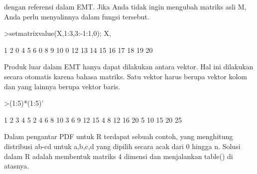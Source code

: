 \documentclass[a4paper,10pt]{article}
\begin{document}
\begin{eulernotebook}
\begin{eulercomment}
\begin{eulercomment}
\begin{eulercomment}
\begin{eulercomment}
\begin{eulercomment}
\begin{eulercomment}
\begin{eulercomment}
\begin{eulercomment}
\begin{eulercomment}
\begin{eulercomment}
\begin{eulercomment}
\begin{eulercomment}
\begin{eulercomment}
\begin{eulercomment}
\begin{eulercomment}
\begin{eulercomment}
\begin{eulercomment}
\begin{eulercomment}
\begin{eulercomment}
\begin{eulercomment}
\begin{eulercomment}
\begin{eulercomment}
\begin{eulercomment}
\begin{eulercomment}
\begin{eulercomment}
\begin{eulercomment}
\begin{eulercomment}
\begin{eulercomment}
\begin{eulercomment}
\begin{eulercomment}
\begin{eulercomment}
\begin{eulercomment}
\begin{eulercomment}
\begin{eulercomment}
\begin{eulercomment}
dengan referensi dalam EMT. Jika Anda tidak ingin mengubah matriks
asli M, Anda perlu menyalinnya dalam fungsi tersebut.
\end{eulercomment}
\begin{eulerprompt}
>setmatrixvalue(X,1:3,3:-1:1,0); X,
\end{eulerprompt}
\begin{euleroutput}
          1         2         0         4         5 
          6         0         8         9        10 
          0        12        13        14        15 
         16        17        18        19        20 
\end{euleroutput}
\begin{eulercomment}
Produk luar dalam EMT hanya dapat dilakukan antara vektor. Hal ini
dilakukan secara otomatis karena bahasa matriks. Satu vektor harus
berupa vektor kolom dan yang lainnya berupa vektor baris.
\end{eulercomment}
\begin{eulerprompt}
>(1:5)*(1:5)'
\end{eulerprompt}
\begin{euleroutput}
          1         2         3         4         5 
          2         4         6         8        10 
          3         6         9        12        15 
          4         8        12        16        20 
          5        10        15        20        25 
\end{euleroutput}
\begin{eulercomment}
Dalam pengantar PDF untuk R terdapat sebuah contoh, yang menghitung
distribusi ab-cd untuk a,b,c,d yang dipilih secara acak dari 0 hingga
n. Solusi dalam R adalah membentuk matriks 4 dimensi dan menjalankan
table() di atasnya.


\end{eulercomment}
\end{eulercomment}
\end{eulercomment}
\end{eulercomment}
\end{eulercomment}
\end{eulercomment}
\end{eulercomment}
\end{eulercomment}
\end{eulercomment}
\end{eulercomment}
\end{eulercomment}
\end{eulercomment}
\end{eulercomment}
\end{eulercomment}
\end{eulercomment}
\end{eulercomment}
\end{eulercomment}
\end{eulercomment}
\end{eulercomment}
\end{eulercomment}
\end{eulercomment}
\end{eulercomment}
\end{eulercomment}
\end{eulercomment}
\end{eulercomment}
\end{eulercomment}
\end{eulercomment}
\end{eulercomment}
\end{eulercomment}
\end{eulercomment}
\end{eulercomment}
\end{eulercomment}
\end{eulercomment}
\end{eulercomment}
\end{eulercomment}
\end{eulernotebook}
\end{document}
